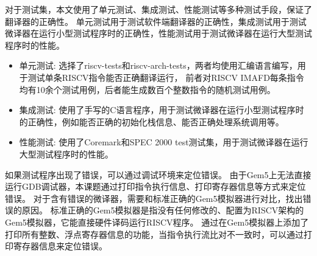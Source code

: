 对于测试集，本文使用了单元测试、集成测试、性能测试等多种测试手段，保证了翻译器的正确性。
单元测试用于测试软件端翻译器的正确性，集成测试用于测试微译器在运行小型测试程序时的正确性，性能测试用于测试微译器在运行大型测试程序时的性能。
\begin{itemize}
\item 单元测试: 选择了riscv-tests\cite{riscv-tests}和riscv-arch-tests\cite{riscv-arch-tests}，两者均使用汇编语言编写，用于测试单条RISCV指令能否正确翻译运行，
前者对RISCV IMAFD每条指令均有10余个测试用例，后者能生成数百个整数指令的随机测试用例。
\item 集成测试: 使用了手写的C语言程序，用于测试微译器在运行小型测试程序时的正确性，例如能否正确的初始化栈信息、能否正确处理系统调用等。
\item 性能测试: 使用了Coremark和SPEC 2000 test测试集，用于测试微译器在运行大型测试程序时的性能。
\end{itemize}

如果测试程序出现了错误，可以通过调试环境来定位错误。
由于Gem5上无法直接运行GDB调试器，本课题通过打印指令执行信息、打印寄存器信息等方式来定位错误。
对于含有错误的微译器，需要和标准正确的Gem5模拟器进行对比，找出错误的原因。
标准正确的Gem5模拟器是指没有任何修改的、配置为RISCV架构的Gem5模拟器，它能直接硬件译码运行RISCV程序。
通过在Gem5模拟器上添加了打印所有整数、浮点寄存器信息的功能，当指令执行流比对不一致时，可以通过打印寄存器信息来定位错误。





